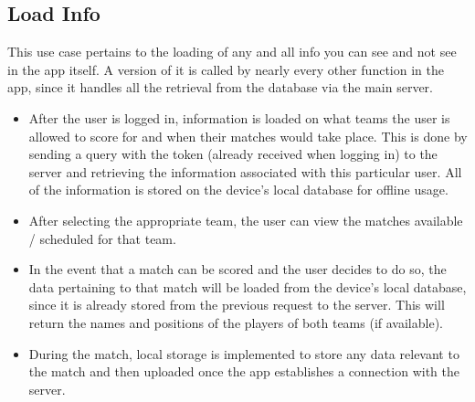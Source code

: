 \documentclass[hidelinks,a4paper,12pt]{article}
\begin{document}
		
	\subsection{Load Info}
		This use case pertains to the loading of any and all info you can see and not see in the app itself. A version of it is called by nearly every other function in the app, since it handles all the retrieval from the database via the main server.
		\begin{itemize}
			\item After the user is logged in, information is loaded on what teams the user is allowed to score for and when their matches would take place. This is done by sending a query with the token (already received when logging in) to the server and retrieving the information associated with this particular user. All of the information is stored on the device's local database for offline usage.
			\item After selecting the appropriate team, the user can view the matches available / scheduled for that team.
			\item In the event that a match can be scored and the user decides to do so, the data pertaining to that match will be loaded from the device's local database, since it is already stored from the previous request to the server. This will return the names and positions of the players of both teams (if available).
			\item During the match, local storage is implemented to store any data relevant to the match and then uploaded once the app establishes a connection with the server.
		\end{itemize}
\end{document}
